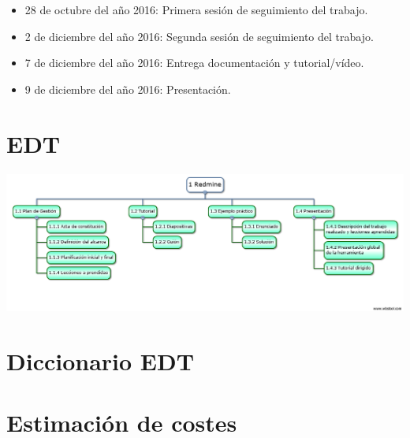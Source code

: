 \documentclass[a4paper,10pt]{scrartcl}
\begin{document}
	\begin{itemize}
		\item 28 de octubre del año 2016: Primera sesión de seguimiento del trabajo.
		
		\item 2 de diciembre del año 2016: Segunda sesión de seguimiento del trabajo.
		
		\item 7 de diciembre del año 2016: Entrega documentación y tutorial/vídeo.
		
		\item 9 de diciembre del año 2016: Presentación.
	\end{itemize}

\section{EDT}

	\begin{center}
		\includegraphics[width=\linewidth]{EDT}
	\end{center}

\section{Diccionario EDT}

\section{Estimación de costes}



\end{document}
